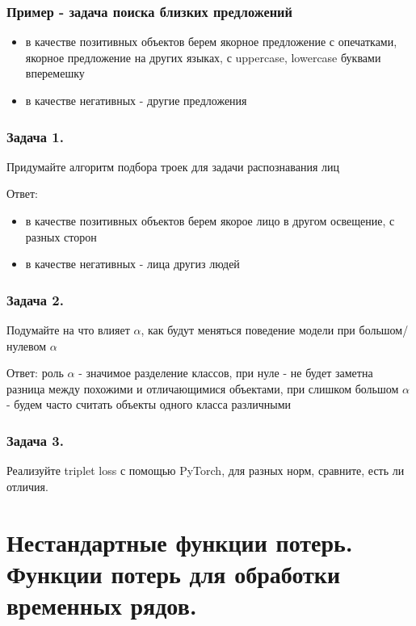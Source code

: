 \subsubsection*{Пример - задача поиска близких предложений}
\begin{itemize}
    \item в качестве позитивных объектов берем якорное предложение с опечатками, якорное предложение на других языках, с uppercase, lowercase буквами вперемешку
    \item в качестве негативных - другие предложения
\end{itemize}

\subsubsection*{Задача 1.}

Придумайте алгоритм подбора троек для задачи распознавания лиц

Ответ:
\begin{itemize}
    \item в качестве позитивных объектов берем якорое лицо в другом освещение, с разных сторон
    \item в качестве негативных - лица другиз людей
\end{itemize}

\subsubsection*{Задача 2.}

Подумайте на что влияет $\alpha$, как будут меняться поведение модели при большом/нулевом $\alpha$

Ответ: роль $\alpha$ - значимое разделение классов,
при нуле - не будет заметна разница между похожими и отличающимися объектами,
при слишком большом $\alpha$ - будем часто считать объекты одного класса различными

\subsubsection*{Задача 3.}

Реализуйте triplet loss с помощью PyTorch, для разных норм, сравните, есть ли отличия.


\newpage

\section*{Нестандартные функции потерь. Функции потерь для обработки временных рядов.}

